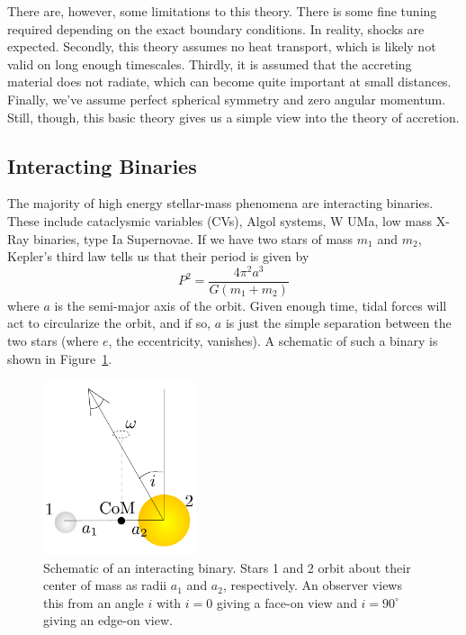 \documentclass[10pt]{article}
\numberwithin{equation}{section}
\newcommand{\n}{\noindent}
\begin{document}
		\n There are, however, some limitations to this theory. There is some fine tuning required depending on the exact boundary conditions. In reality, shocks are expected. Secondly, this theory assumes no heat transport, which is likely not valid on long enough timescales. Thirdly, it is assumed that the accreting material does not radiate, which can become quite important at small distances. Finally, we've assume perfect spherical symmetry and zero angular momentum. Still, though, this basic theory gives us a simple view into the theory of accretion.
		
	
	\subsection{Interacting Binaries} %
	\label{sub:interacting_binaries}
	The majority of high energy stellar-mass phenomena are interacting binaries. These include cataclysmic variables (CVs), Algol systems, W UMa, low mass X-Ray binaries, type Ia Supernovae. If we have two stars of mass $m_1$ and $m_2$, Kepler's third law tells us that their period is given by
	\begin{equation}
		\label{eq:binaries:1} P^2 = \frac{4\pi^2a^3}{G(m_1+m_2)}
	\end{equation}
	where $a$ is the semi-major axis of the orbit. Given enough time, tidal forces will act to circularize the orbit, and if so, $a$ is just the simple separation between the two stars (where $e$, the eccentricity, vanishes). A schematic of such a binary is shown in Figure~\ref{fig:binaries:1}.
	\begin{figure}[h]
		\centering
		\includegraphics[width = 0.4\textwidth]{figures/interacting_binary.pdf}
		\caption{Schematic of an interacting binary. Stars 1 and 2 orbit about their center of mass as radii $a_1$ and $a_2$, respectively. An observer views this from an angle $i$ with $i=0$ giving a face-on view and $i=90^\circ$ giving an edge-on view.}
		\label{fig:binaries:1}
	\end{figure}
\end{document}
